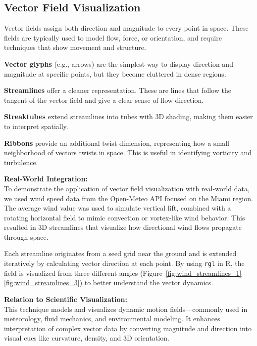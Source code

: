 \documentclass[11pt]{article}
\begin{document}
	\subsection{Vector Field Visualization}
	Vector fields assign both direction and magnitude to every point in space. These fields are typically used to model flow, force, or orientation, and require techniques that show movement and structure.
	
	\textbf{Vector glyphs} (e.g., arrows) are the simplest way to display direction and magnitude at specific points, but they become cluttered in dense regions.
	
	\textbf{Streamlines} offer a cleaner representation. These are lines that follow the tangent of the vector field and give a clear sense of flow direction.
	
	\textbf{Streaktubes} extend streamlines into tubes with 3D shading, making them easier to interpret spatially.
	
	\textbf{Ribbons} provide an additional twist dimension, representing how a small neighborhood of vectors twists in space. This is useful in identifying vorticity and turbulence.
	
	\vspace{1em}
	\noindent
	\textbf{Real-World Integration:} \\
	To demonstrate the application of vector field visualization with real-world data, we used wind speed data from the Open-Meteo API focused on the Miami region. The average wind value was used to simulate vertical lift, combined with a rotating horizontal field to mimic convection or vortex-like wind behavior. This resulted in 3D streamlines that visualize how directional wind flows propagate through space.
	
	Each streamline originates from a seed grid near the ground and is extended iteratively by calculating vector direction at each point. By using \texttt{rgl} in R, the field is visualized from three different angles (Figure~\ref{fig:wind_streamlines_1}–\ref{fig:wind_streamlines_3}) to better understand the vector dynamics.
	
	\vspace{1em}
	\textbf{Relation to Scientific Visualization:} \\
	This technique models and visualizes dynamic motion fields—commonly used in meteorology, fluid mechanics, and environmental modeling. It enhances interpretation of complex vector data by converting magnitude and direction into visual cues like curvature, density, and 3D orientation.
	
\end{document}
